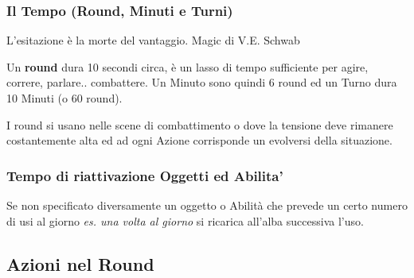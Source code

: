 \begin{multicols}{2}
\subsubsection{Il Tempo (Round, Minuti e Turni)}\label{iltempo}

\begin{changemargin}{0.3cm}{0.3cm}\begin{enfasi}{L'esitazione è la morte del vantaggio. Magic di V.E. Schwab} \end{enfasi}\end{changemargin}\medskip

Un \textbf{round} dura 10 secondi circa, è un lasso di tempo sufficiente per agire, correre, parlare.. combattere. Un Minuto sono quindi 6 round ed un Turno dura 10 Minuti (o 60 round).

I round si usano nelle scene di combattimento o dove la tensione deve rimanere costantemente alta ed ad ogni Azione corrisponde un evolversi della situazione.

\subsubsection{Tempo di riattivazione Oggetti ed Abilita'}\label{temporiattivazioneoggetti}

Se non specificato diversamente un oggetto o Abilità che prevede un certo numero di usi al giorno \emph{es. una volta al giorno} si ricarica all'alba successiva l'uso.



\subsection{Azioni nel Round}\label{azioninelround}



\end{multicols}
